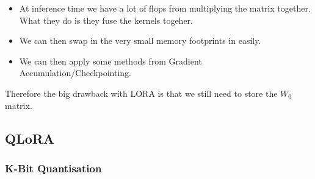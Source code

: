 \documentclass[11pt]{article}
\begin{document}
\begin{minipage}[l]{.5\linewidth}
    \begin{figure}[H]
        \centering
    \end{figure}    
\end{minipage}\hfill
\begin{minipage}[r]{.48\linewidth}
    \begin{itemize}
        \item At inference time we have a lot of flops from multiplying the matrix together. What they do is they fuse the kernels togeher.
        \item We can then swap in the very small memory footprints in easily.
        \item We can then apply some methods from Gradient Accumulation/Checkpointing.
    \end{itemize}
\end{minipage}

Therefore the big drawback with LORA is that we still need to store the $W_0$ matrix.

\subsection{QLoRA}

\subsubsection{K-Bit Quantisation}
\end{document}
